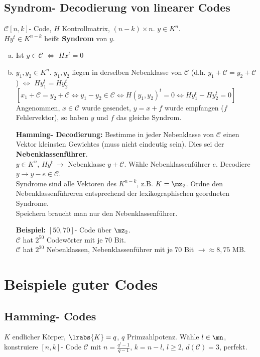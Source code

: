 	\subsection{Syndrom- Decodierung von linearer Codes}
		$ \mathcal{C}[n,k] $- Code, $ H $ Kontrollmatrix, $ (n-k)\times n $. $ y\in K^n $.\\
		$ Hy^t\in K^{n-k} $ heißt \textbf{Syndrom} von $ y $.
		\begin{enumerate}[a)]
			\item Ist $ y\in \mathcal{C} $ $ \Leftrightarrow $ $ Hx^t=0 $
			\item $ y_1,y_2\in K^n $. $ y_1,y_2 $ liegen in derselben Nebenklasse von $ \mathcal{C} $ (d.h. $ y_1+\mathcal{C}=y_2+\mathcal{C} $) $ \Leftrightarrow $ $ Hy_1^t=Hy_2^t $\\
			$ [x_1+\mathcal{C}=y_2+\mathcal{C}\Leftrightarrow y_1-y_2\in \mathcal{C}\Leftrightarrow H(y_1,y_2)^t=0\Leftrightarrow Hy_1^t-Hy_2^t=0] $\\
			Angenommen, $ x\in \mathcal{C} $ wurde gesendet, $ y=x+f $ wurde empfangen ($ f $ Fehlervektor), so haben $ y $ und $f$ das gleiche Syndrom.
			
			\textbf{Hamming- Decodierung:} Bestimme in jeder Nebenklasse von $ \mathcal{C} $ einen Vektor kleinsten Gewichtes (muss nicht eindeutig sein). Dies sei der \textbf{Nebenklassenführer}.\\
			$ y\in K^n $, $ Hy^t\ \rightarrow $ Nebenklasse $ y+\mathcal{C} $. Wähle Nebenklassenführer $ e $. Decodiere $ y\rightarrow y-e\in \mathcal{C} $.\\
			Syndrome sind alle Vektoren des $ K^{n-k} $, z.B. $ K=\mz_2 $. Ordne den Nebenklassenführeren entsprechend der lexikographischen geordneten Syndrome.\\
			Speichern braucht man nur den Nebenklassenführer.
			
			\textbf{Beispiel:} $ [50,70] $- Code über $ \mz_2 $.\\
			$ \mathcal{C} $ hat $ 2^{50} $ Codewörter mit je $ 70 $ Bit.\\
			$ \mathcal{C} $ hat $ 2^{20} $ Nebenklassen, Nebenklassenführer mit je $ 70 $ Bit $ \rightarrow\approx 8,75 $ MB.
		\end{enumerate}

\section{Beispiele guter Codes}
	\subsection{Hamming- Codes}
		$ K $ endlicher Körper, $ \lrabs{K}=q $, $ q $ Primzahlpotenz. Wähle $ l\in\mn $, konstruiere $ [n,k] $- Code $ \mathcal{C} $ mit $ n=\frac{q^l-1}{q-1} $, $ k=n-l $, $ l\geq 2 $, $d(\mathcal{C})=3$, perfekt.
		
